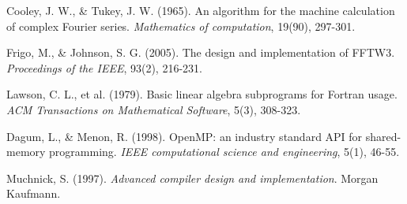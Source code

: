 \documentclass[a4paper]{article}
\begin{document}
\begin{thebibliography}{9}
    Cooley, J. W., \& Tukey, J. W. (1965). An algorithm for the machine calculation of complex Fourier series. \textit{Mathematics of computation}, 19(90), 297-301.

    Frigo, M., \& Johnson, S. G. (2005). The design and implementation of FFTW3. \textit{Proceedings of the IEEE}, 93(2), 216-231.

    Lawson, C. L., et al. (1979). Basic linear algebra subprograms for Fortran usage. \textit{ACM Transactions on Mathematical Software}, 5(3), 308-323.

    Dagum, L., \& Menon, R. (1998). OpenMP: an industry standard API for shared-memory programming. \textit{IEEE computational science and engineering}, 5(1), 46-55.

    Muchnick, S. (1997). \textit{Advanced compiler design and implementation}. Morgan Kaufmann.
\end{thebibliography}
\end{document}
